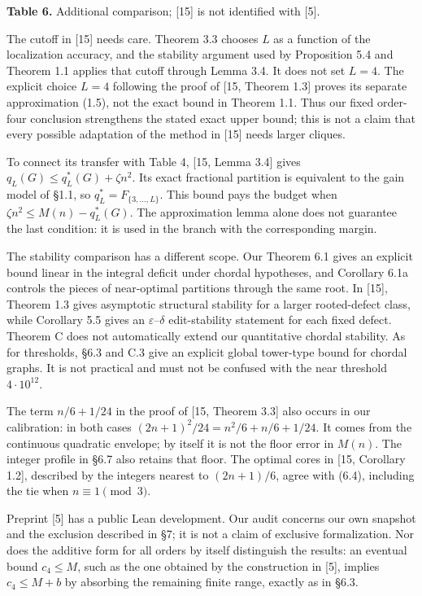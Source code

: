 \documentclass[english,11pt,a4paper]{article}
\begin{document}
\textbf{Table 6.} Additional comparison; {[}15{]} is not identified with {[}5{]}.

The cutoff in {[}15{]} needs care. Theorem 3.3 chooses \(L\) as a function of the localization accuracy, and the stability argument used by Proposition 5.4 and Theorem 1.1 applies that cutoff through Lemma 3.4. It does not set \(L=4\). The explicit choice \(L=4\) following the proof of {[}15, Theorem 1.3{]} proves its separate approximation (1.5), not the exact bound in Theorem 1.1. Thus our fixed order-four conclusion strengthens the stated exact upper bound; this is not a claim that every possible adaptation of the method in {[}15{]} needs larger cliques.

To connect its transfer with Table 4, {[}15, Lemma 3.4{]} gives \(q_L(G)\le q_L^*(G)+\zeta n^2\). Its exact fractional partition is equivalent to the gain model of §1.1, so \(q_L^*=F_{\{3,\ldots,L\}}\). This bound pays the budget when \(\zeta n^2\le M(n)-q_L^*(G)\). The approximation lemma alone does not guarantee the last condition: it is used in the branch with the corresponding margin.

The stability comparison has a different scope. Our Theorem 6.1 gives an explicit bound linear in the integral deficit under chordal hypotheses, and Corollary 6.1a controls the pieces of near-optimal partitions through the same root. In {[}15{]}, Theorem 1.3 gives asymptotic structural stability for a larger rooted-defect class, while Corollary 5.5 gives an \(\varepsilon\)--\(\delta\) edit-stability statement for each fixed defect. Theorem C does not automatically extend our quantitative chordal stability. As for thresholds, §6.3 and C.3 give an explicit global tower-type bound for chordal graphs. It is not practical and must not be confused with the near threshold \(4\cdot10^{12}\).

The term \(n/6+1/24\) in the proof of {[}15, Theorem 3.3{]} also occurs in our calibration: in both cases \((2n+1)^2/24=n^2/6+n/6+1/24\). It comes from the continuous quadratic envelope; by itself it is not the floor error in \(M(n)\). The integer profile in §6.7 also retains that floor. The optimal cores in {[}15, Corollary 1.2{]}, described by the integers nearest to \((2n+1)/6\), agree with (6.4), including the tie when \(n\equiv1\pmod3\).

Preprint {[}5{]} has a public Lean development. Our audit concerns our own snapshot and the exclusion described in §7; it is not a claim of exclusive formalization. Nor does the additive form for all orders by itself distinguish the results: an eventual bound \(c_4\le M\), such as the one obtained by the construction in {[}5{]}, implies \(c_4\le M+b\) by absorbing the remaining finite range, exactly as in §6.3.
\end{document}
